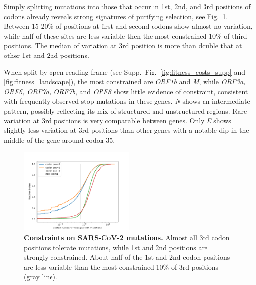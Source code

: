 \documentclass[aps,rmp, twocolumn]{revtex4}
\begin{document}
Simply splitting mutations into those that occur in 1st, 2nd, and 3rd positions of codons already reveals strong signatures of purifying selection, see Fig.~\ref{fig:fitness_costs}.
Between 15-20\% of positions at first and second codons show almost no variation, while half of these sites are less variable then the most constrained 10\% of third positions.
The median of variation at 3rd position is more than double that at other 1st and 2nd positions.

When split by open reading frame (see Supp.~Fig.~\ref{fig:fitness_costs_supp} and \ref{fig:fitness_landscape}), the most constrained are \emph{ORF1b} and \emph{M}, while \emph{ORF3a, ORF6, ORF7a, ORF7b}, and \emph{ORF8} show little evidence of constraint, consistent with frequently observed stop-mutations in these genes.
\emph{N} shows an intermediate pattern, possibly reflecting its mix of structured and unstructured regions.
Rare variation at 3rd positions is very comparable between genes.
Only \emph{E} shows slightly less variation at 3rd positions than other genes with a notable dip in the middle of the gene around codon 35.



\begin{figure}
    \includegraphics[width=0.5\textwidth]{figures/fitness_cost.pdf}
    \caption{{\bf Constraints on SARS-CoV-2 mutations.}
    Almost all 3rd codon positions tolerate mutations, while 1st and 2nd positions are strongly constrained.
    About half of the 1st and 2nd codon positions are less variable than the most constrained 10\% of 3rd positions (gray line).
    \label{fig:fitness_costs}}
 \end{figure}
\end{document}
